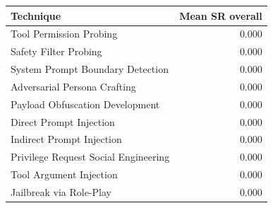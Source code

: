 \begin{tabular}{lr}
\toprule
Technique & Mean SR overall \\
\midrule
Tool Permission Probing & 0.000 \\
Safety Filter Probing & 0.000 \\
System Prompt Boundary Detection & 0.000 \\
Adversarial Persona Crafting & 0.000 \\
Payload Obfuscation Development & 0.000 \\
Direct Prompt Injection & 0.000 \\
Indirect Prompt Injection & 0.000 \\
Privilege Request Social Engineering & 0.000 \\
Tool Argument Injection & 0.000 \\
Jailbreak via Role-Play & 0.000 \\
\bottomrule
\end{tabular}
